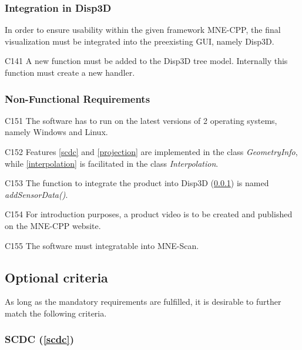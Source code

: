 \subsubsection{Integration in Disp3D} \label{integration}
	
	In order to ensure usability within the given framework MNE-CPP, the final visualization must be integrated into the 			preexisting GUI, namely Disp3D.
	
	\begin{aims}
		
		\item[C141] A new function must be added to the Disp3D tree model. Internally this function must create a new 								handler. 
		
	\end{aims}
	
\subsubsection{Non-Functional Requirements}		
	
	
	\begin{aims}

		\item[C151] The software has to run on the latest versions of 2 operating systems, namely Windows and Linux. 
		\item[C152] Features \ref{scdc} and \ref{projection} are implemented in the class \textit{GeometryInfo}, while \ref{interpolation} is facilitated in the class \textit{Interpolation}.
		\item[C153] The function to integrate the product into Disp3D (\ref{integration}) is named \textit{addSensorData()}.
		\item[C154] For introduction purposes, a product video is to be created and published on the MNE-CPP website.  
		\item[C155] The software must integratable into MNE-Scan. 
	\end{aims}
	
\newpage	
	
\subsection{Optional criteria}
	
	As long as the mandatory requirements are fulfilled, it is desirable to further match the following criteria. 	
	
\subsubsection{SCDC (\ref{scdc})}
	
